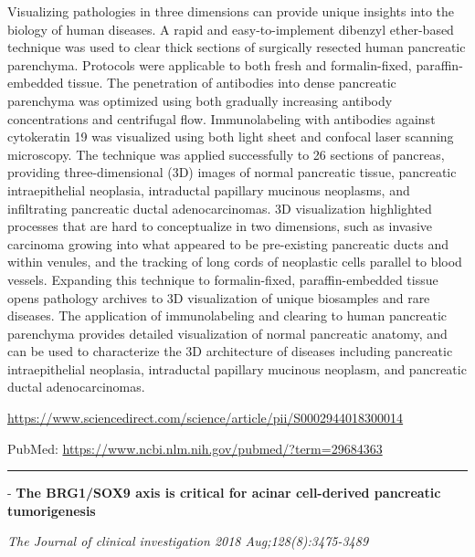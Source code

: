 \documentclass[]{article}
\begin{document}
Visualizing pathologies in three dimensions can provide unique insights
into the biology of human diseases. A rapid and easy-to-implement
dibenzyl ether-based technique was used to clear thick sections of
surgically resected human pancreatic parenchyma. Protocols were
applicable to both fresh and formalin-fixed, paraffin-embedded tissue.
The penetration of antibodies into dense pancreatic parenchyma was
optimized using both gradually increasing antibody concentrations and
centrifugal flow. Immunolabeling with antibodies against cytokeratin 19
was visualized using both light sheet and confocal laser scanning
microscopy. The technique was applied successfully to 26 sections of
pancreas, providing three-dimensional (3D) images of normal pancreatic
tissue, pancreatic intraepithelial neoplasia, intraductal papillary
mucinous neoplasms, and infiltrating pancreatic ductal adenocarcinomas.
3D visualization highlighted processes that are hard to conceptualize in
two dimensions, such as invasive carcinoma growing into what appeared to
be pre-existing pancreatic ducts and within venules, and the tracking of
long cords of neoplastic cells parallel to blood vessels. Expanding this
technique to formalin-fixed, paraffin-embedded tissue opens pathology
archives to 3D visualization of unique biosamples and rare diseases. The
application of immunolabeling and clearing to human pancreatic
parenchyma provides detailed visualization of normal pancreatic anatomy,
and can be used to characterize the 3D architecture of diseases
including pancreatic intraepithelial neoplasia, intraductal papillary
mucinous neoplasm, and pancreatic ductal adenocarcinomas.

\url{https://www.sciencedirect.com/science/article/pii/S0002944018300014}

PubMed: \url{https://www.ncbi.nlm.nih.gov/pubmed/?term=29684363}

{}

{}

\begin{center}\rule{0.5\linewidth}{\linethickness}\end{center}

 - \textbf{The BRG1/SOX9 axis is critical for acinar cell-derived
pancreatic tumorigenesis}

\emph{The Journal of clinical investigation 2018 Aug;128(8):3475-3489}
\end{document}
